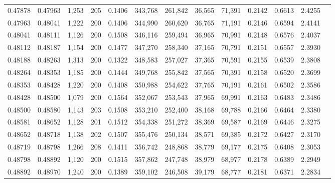 \begin{tabular}{rrrrrrrrrrrrr}
0.47878 & 0.47963 & 1,253 & 205 &                                     0.1406 & 343,768 & 261,842 &  36,565 &  71,391 & 0.2142 & 0.6613 & 2.4255 \\
0.47963 & 0.48041 & 1,222 & 200 &                                     0.1406 & 344,990 & 260,620 &  36,765 &  71,191 & 0.2146 & 0.6594 & 2.4141 \\
0.48041 & 0.48111 & 1,126 & 200 &                                     0.1508 & 346,116 & 259,494 &  36,965 &  70,991 & 0.2148 & 0.6576 & 2.4037 \\
0.48112 & 0.48187 & 1,154 & 200 &                                     0.1477 & 347,270 & 258,340 &  37,165 &  70,791 & 0.2151 & 0.6557 & 2.3930 \\
0.48188 & 0.48263 & 1,313 & 200 &                                     0.1322 & 348,583 & 257,027 &  37,365 &  70,591 & 0.2155 & 0.6539 & 2.3808 \\
0.48264 & 0.48353 & 1,185 & 200 &                                     0.1444 & 349,768 & 255,842 &  37,565 &  70,391 & 0.2158 & 0.6520 & 2.3699 \\
0.48353 & 0.48428 & 1,220 & 200 &                                     0.1408 & 350,988 & 254,622 &  37,765 &  70,191 & 0.2161 & 0.6502 & 2.3586 \\
0.48428 & 0.48500 & 1,079 & 200 &                                     0.1564 & 352,067 & 253,543 &  37,965 &  69,991 & 0.2163 & 0.6483 & 2.3486 \\
0.48500 & 0.48580 & 1,143 & 203 &                                     0.1508 & 353,210 & 252,400 &  38,168 &  69,788 & 0.2166 & 0.6464 & 2.3380 \\
0.48581 & 0.48652 & 1,128 & 201 &                                     0.1512 & 354,338 & 251,272 &  38,369 &  69,587 & 0.2169 & 0.6446 & 2.3275 \\
0.48652 & 0.48718 & 1,138 & 202 &                                     0.1507 & 355,476 & 250,134 &  38,571 &  69,385 & 0.2172 & 0.6427 & 2.3170 \\
0.48719 & 0.48798 & 1,266 & 208 &                                     0.1411 & 356,742 & 248,868 &  38,779 &  69,177 & 0.2175 & 0.6408 & 2.3053 \\
0.48798 & 0.48892 & 1,120 & 200 &                                     0.1515 & 357,862 & 247,748 &  38,979 &  68,977 & 0.2178 & 0.6389 & 2.2949 \\
0.48892 & 0.48970 & 1,240 & 200 &                                     0.1389 & 359,102 & 246,508 &  39,179 &  68,777 & 0.2181 & 0.6371 & 2.2834 \\

\end{tabular}
